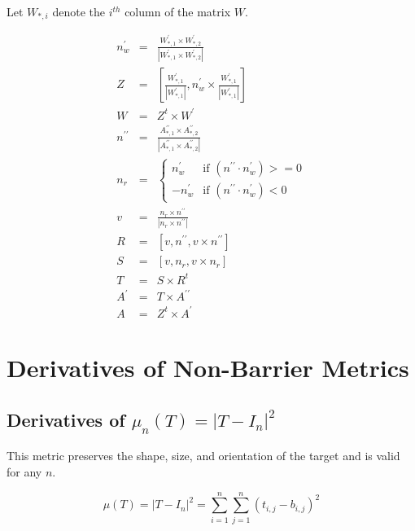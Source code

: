 \documentclass{report}
\begin{document}
Let $W_{*,i}$ denote the $i^{th}$ column of the matrix $W$.

\begin{eqnarray}
n^\prime_w &=& \frac{W^\prime_{*,1} \times W^\prime_{*,2}}
                   {|W^\prime_{*,1} \times W^\prime_{*,2}|} \\
Z &=& \left[ \frac{W^\prime_{*,1}}{|W^\prime_{*,1}|}, 
              n^\prime_w \times \frac{W^\prime_{*,1}}{|W^\prime_{*,1}|} \right] \\
W &=& Z^t \times W^\prime \\
n^{\prime\prime} &=& \frac{A^{\prime\prime}_{*,1} \times A^{\prime\prime}_{*,2}}
                       {|A^{\prime\prime}_{*,1} \times A^{\prime\prime}_{*,2}|} \\
n_r &=& \left\{ \begin{array}{ll} 
         n^\prime_w & \textrm{if $(n^{\prime\prime} \cdot n^\prime_w) >= 0$} \\
        -n^\prime_w & \textrm{if $(n^{\prime\prime} \cdot n^\prime_w) < 0$}
        \end{array} \right. \\
v &=& \frac{n_r \times n^{\prime\prime}}{|n_r \times n^{\prime\prime}|} \\
R &=& \left[ v, n^{\prime\prime}, v \times n^{\prime\prime} \right] \\
S &=& \left[ v, n_r, v \times n_r \right] \\
T &=& S \times R^t \\
A^\prime &=& T \times A^{\prime\prime} \\
A &=& Z^t \times A^\prime
\end{eqnarray}

\section{Derivatives of Non-Barrier Metrics}

\subsection{Derivatives of $\mu_n (T)=|T-I_n|^2$ \label{tmi}}

\noindent  This metric preserves the shape, size, and orientation of the target and is valid for any $n$. \newline

\begin{equation}
\mu(T) = |T-I_n|^2 = \sum_{i=1}^n \sum_{j=1}^n (t_{i,j} - b_{i,j})^2
\end{equation}
\end{document}
